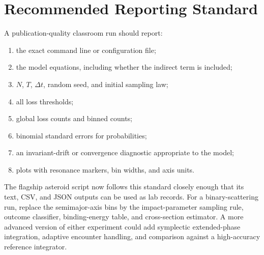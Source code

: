 \section{Recommended Reporting Standard}
\label{sec:three-body-reporting-standard}

A publication-quality classroom run should report:
\begin{enumerate}
\item the exact command line or configuration file;
\item the model equations, including whether the indirect term is included;
\item \(N\), \(T\), \(\Delta t\), random seed, and initial sampling law;
\item all loss thresholds;
\item global loss counts and binned counts;
\item binomial standard errors for probabilities;
\item an invariant-drift or convergence diagnostic appropriate to the model;
\item plots with resonance markers, bin widths, and axis units.
\end{enumerate}

The flagship asteroid script now follows this standard closely enough that its
text, CSV, and JSON outputs can be used as lab records.  For a binary-scattering
run, replace the semimajor-axis bins by the impact-parameter sampling rule,
outcome classifier, binding-energy table, and cross-section estimator.  A more
advanced version of either experiment could add symplectic extended-phase
integration, adaptive encounter handling, and comparison against a
high-accuracy reference integrator.
